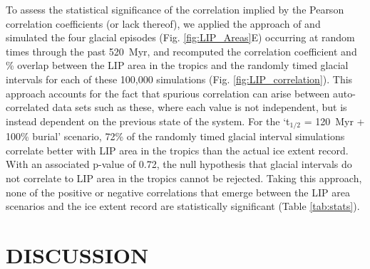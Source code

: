 \documentclass[11pt,letterpaper]{article}
\begin{document}
To assess the statistical significance of the correlation implied by the Pearson correlation coefficients (or lack thereof), we applied the approach of \citet{Macdonald2019a} and simulated the four glacial episodes (Fig. \ref{fig:LIP_Areas}E) occurring at random times through the past 520~Myr, and recomputed the correlation coefficient and \% overlap between the LIP area in the tropics and the randomly timed glacial intervals for each of these 100,000 simulations (Fig. \ref{fig:LIP_correlation}). This approach accounts for the fact that spurious correlation can arise between auto-correlated data sets such as these, where each value is not independent, but is instead dependent on the previous state of the system. For the `t$_{1/2}$ = 120~Myr + 100\% burial' scenario, 72\% of the randomly timed glacial interval simulations correlate better with LIP area in the tropics than the actual ice extent record. With an associated p-value of 0.72, the null hypothesis that glacial intervals do not correlate to LIP area in the tropics cannot be rejected. Taking this approach, none of the positive or negative correlations that emerge between the LIP area scenarios and the ice extent record are statistically significant (Table \ref{tab:stats}).

\section*{DISCUSSION}
\end{document}
